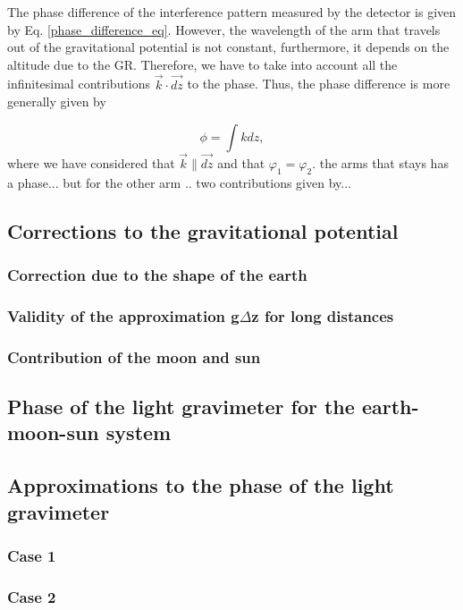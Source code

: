 \documentclass{article}
\begin{document}
The phase difference of the interference pattern measured by the detector is given by Eq. \ref{phase_difference_eq}. However, the wavelength of the arm that travels out of the gravitational potential is not constant, furthermore, it depends on the altitude due to the GR. Therefore, we have to take into account all the infinitesimal contributions $\Vec{k} \cdot \Vec{dz}$ to the phase. Thus, the phase difference is more generally given by

\begin{equation}
    \phi = \int k dz,
\end{equation}
%
where we have considered that $\Vec{k} \parallel \Vec{dz}$ and that $\varphi_{1} = \varphi_{2}$. the arms that stays has a phase... but for the other arm .. two contributions given by...

\subsection{Corrections to the gravitational potential}

\subsubsection{Correction due to the shape of the earth}
\subsubsection{Validity of the approximation g$\Delta$z for long distances}
\subsubsection{Contribution of the moon and sun}

\subsection{Phase of the light gravimeter for the earth-moon-sun system}

\subsection{Approximations to the phase of the light gravimeter}

\subsubsection{Case 1}
\subsubsection{Case 2}
\end{document}
